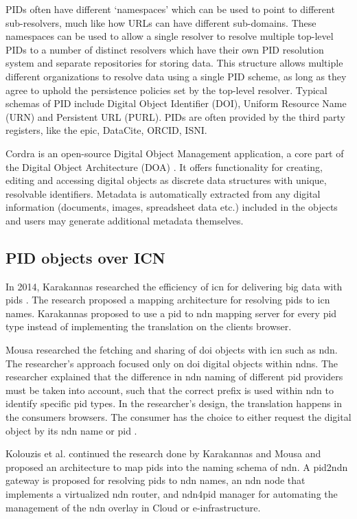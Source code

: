 \documentclass[conference]{IEEEtran}
\begin{document}
PIDs often have different `namespaces' which can be used to point to different sub-resolvers, much like how URLs can have different sub-domains. These namespaces can be used to allow a single resolver to resolve multiple top-level PIDs to a number of distinct resolvers which have their own PID resolution system and separate repositories for storing data. This structure allows multiple different organizations to resolve data using a single PID scheme, as long as they agree to uphold the persistence policies set by the top-level resolver. Typical schemas of PID include Digital Object Identifier (DOI), Uniform Resource Name (URN) and Persistent URL (PURL). PIDs are often provided by the third party registers, like the \gls{epic}, DataCite, ORCID, ISNI. 


Cordra \cite{cordra} is an open-source Digital Object Management application, a core part of the Digital Object Architecture (DOA) \cite{sharp2016overview}. It offers functionality for creating, editing and accessing digital objects as discrete data structures with unique, resolvable identifiers. Metadata is automatically extracted from any digital information (documents, images, spreadsheet data etc.) included in the objects and users may generate additional metadata themselves.

\subsection{PID objects over ICN}
In 2014, Karakannas researched the efficiency of \gls{icn} for delivering big data with \glspl{pid} \cite{icn-bd}. The research proposed a mapping architecture for resolving \glspl{pid} to \gls{icn} names. Karakannas proposed to use a \gls{pid} to \gls{ndn} mapping server for every \gls{pid} type instead of implementing the translation on the clients browser.

Mousa researched the fetching and sharing of \gls{doi} objects with \gls{icn} such as \gls{ndn}. The researcher's approach focused only on \gls{doi} digital objects within \glspl{ndn}. The researcher explained that the difference in \gls{ndn} naming of different \gls{pid} providers must be taken into account, such that the correct prefix is used within \gls{ndn} to identify specific \gls{pid} types. In the researcher's design, the translation happens in the consumers browsers. The consumer has the choice to either request the digital object by its \gls{ndn} name or \gls{pid} \cite{ndn-app-aware}.

Kolouzis et al. continued the research done by Karakannas \cite{icn-bd} and Mousa \cite{ndn-app-aware} and proposed an architecture to map \glspl{pid} into the naming schema of \gls{ndn}. A \gls{pid}2\gls{ndn} gateway is proposed for resolving \glspl{pid} to \gls{ndn} names, an \gls{ndn} node that implements a virtualized \gls{ndn} router, and  \gls{ndn}4\gls{pid} manager for automating the management of the \gls{ndn} overlay in Cloud or e-infrastructure.
\end{document}
